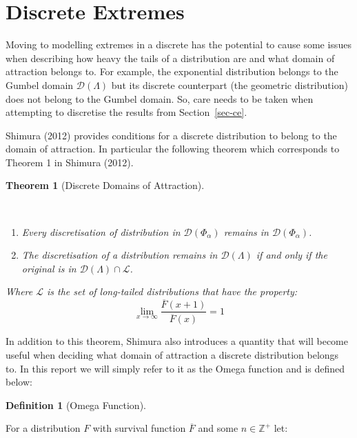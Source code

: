 \documentclass[
  10pt,
  a4paper,
]{scrreprt}
\providecommand{\tightlist}{%
  \setlength{\itemsep}{0pt}\setlength{\parskip}{0pt}}\usepackage{longtable,booktabs,array}
\theoremstyle{definition}
\newtheorem{definition}{Definition}[section]
\theoremstyle{plain}
\newtheorem{theorem}{Theorem}[section]
\theoremstyle{remark}
\begin{document}
{\hypertarget{discrete-extremes}{%
\section{Discrete Extremes}\label{discrete-extremes}}

Moving to modelling extremes in a discrete has the potential to cause
some issues when describing how heavy the tails of a distribution are
and what domain of attraction belongs to. For example, the exponential
distribution belongs to the Gumbel domain \(\mathcal D(\Lambda)\) but
its discrete counterpart (the geometric distribution) does not belong to
the Gumbel domain. So, care needs to be taken when attempting to
discretise the results from Section~\ref{sec-ce}.

Shimura (2012) provides conditions for a discrete distribution to belong
to the domain of attraction. In particular the following theorem which
corresponds to Theorem 1 in Shimura (2012).

\begin{theorem}[Discrete Domains of
Attraction]\protect\hypertarget{thm-shimura1}{}\label{thm-shimura1}

~

\begin{enumerate}
\def\labelenumi{(\alph{enumi})}
\tightlist
\item
  Every discretisation of distribution in \(\mathcal D(\Phi_\alpha)\)
  remains in \(\mathcal D(\Phi_\alpha)\).
\item
  The discretisation of a distribution remains in
  \(\mathcal D(\Lambda)\) if and only if the original is in
  \(\mathcal D(\Lambda)\cap \mathcal L\).
\end{enumerate}

Where \(\mathcal L\) is the set of long-tailed distributions that have
the property: \[
\lim_{x\rightarrow \infty}\frac{\overline F(x+1)}{\overline F(x)} = 1   
\]

\end{theorem}

In addition to this theorem, Shimura also introduces a quantity that
will become useful when deciding what domain of attraction a discrete
distribution belongs to. In this report we will simply refer to it as
the Omega function and is defined below:

\begin{definition}[Omega
Function]\protect\hypertarget{def-omega}{}\label{def-omega}

For a distribution \(F\) with survival function \(\overline F\) and some
\(n\in\mathbb Z^+\) let:


\end{definition}}
\end{document}
